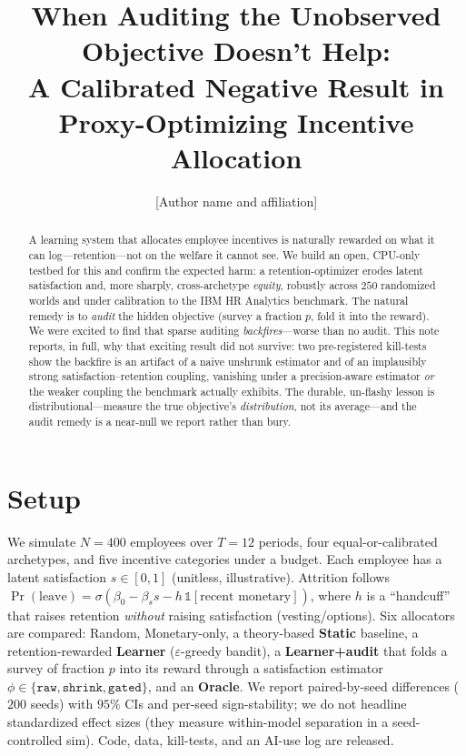 \documentclass[11pt]{article}
\title{\textbf{When Auditing the Unobserved Objective Doesn't Help:\\
A Calibrated Negative Result in Proxy-Optimizing Incentive Allocation}}
\author{[Author name and affiliation]}
\date{}
\begin{document}
\maketitle

\begin{abstract}
A learning system that allocates employee incentives is naturally rewarded on
what it can log---retention---not on the welfare it cannot see. We build an open,
CPU-only testbed for this and confirm the expected harm: a retention-optimizer
erodes latent satisfaction and, more sharply, cross-archetype \emph{equity},
robustly across $250$ randomized worlds and under calibration to the IBM HR
Analytics benchmark. The natural remedy is to \emph{audit} the hidden objective
(survey a fraction $p$, fold it into the reward). We were excited to find that
sparse auditing \emph{backfires}---worse than no audit. This note reports, in
full, why that exciting result did not survive: two pre-registered kill-tests show
the backfire is an artifact of a naive unshrunk estimator and of an
implausibly strong satisfaction--retention coupling, vanishing under a
precision-aware estimator \emph{or} the weaker coupling the benchmark actually
exhibits. The durable, un-flashy lesson is distributional---measure the true
objective's \emph{distribution}, not its average---and the audit remedy is a
near-null we report rather than bury.
\end{abstract}

\section{Setup}
We simulate $N{=}400$ employees over $T{=}12$ periods, four equal-or-calibrated
archetypes, and five incentive categories under a budget. Each employee has a
latent satisfaction $s\in[0,1]$ (unitless, illustrative). Attrition follows
$\Pr(\text{leave})=\sigma(\beta_0-\beta_s s-h\,\mathbb{1}[\text{recent monetary}])$,
where $h$ is a ``handcuff'' that raises retention \emph{without} raising
satisfaction (vesting/options). Six allocators are compared: Random,
Monetary-only, a theory-based \textbf{Static} baseline, a retention-rewarded
\textbf{Learner} ($\varepsilon$-greedy bandit), a \textbf{Learner+audit} that
folds a survey of fraction $p$ into its reward through a satisfaction estimator
$\phi\in\{\texttt{raw},\texttt{shrink},\texttt{gated}\}$, and an \textbf{Oracle}.
We report paired-by-seed differences ($200$ seeds) with $95\%$ CIs and per-seed
sign-stability; we do not headline standardized effect sizes (they measure
within-model separation in a seed-controlled sim). Code, data, kill-tests, and an
AI-use log are released.
\end{document}
